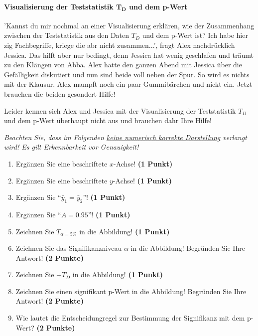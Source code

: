 \documentclass[a4paper, 9pt]{scrartcl}\usepackage[]{graphicx}\usepackage[]{xcolor}
\begin{document}
\ifcollection
\paragraph{Visualisierung der Teststatistik $\boldsymbol{T_D}$ und dem p-Wert}
\fi

'Kannst du mir nochmal an einer Visualisierung erklären, wie der Zusammenhang zwischen der Teststatistik aus den Daten $T_D$ und dem p-Wert ist? Ich habe hier zig Fachbegriffe, kriege die abr nicht zusammen...', fragt Alex nachdrücklich  Jessica. Das hilft aber nur bedingt, denn Jessica hat wenig geschlafen und träumt zu den Klängen von Abba. Alex hatte den ganzen Abend mit Jessica über die Gefälligkeit diskutiert und nun sind beide voll neben der Spur. So wird es nichts mit der Klausur. Alex mampft noch ein paar Gummibärchen und nickt ein. Jetzt brauchen die beiden gesondert Hilfe!

\vspace{1ex}

Leider kennen sich Alex und Jessica mit der Visualisierung der Teststatistik $T_D$ und dem p-Wert überhaupt nicht aus und brauchen dahr Ihre Hilfe!

\vspace{1ex}

\textit{Beachten Sie, dass im Folgenden \underline{keine numerisch korrekte Darstellung} verlangt wird! Es gilt Erkennbarkeit vor Genauigkeit!}

\begin{enumerate}
\item Ergänzen Sie eine beschriftete $x$-Achse! \textbf{(1 Punkt)}
\item Ergänzen Sie eine beschriftete $y$-Achse! \textbf{(1 Punkt)}
\item Ergänzen Sie "`$\bar{y}_1 = \bar{y}_2$"'! \textbf{(1 Punkt)} 
\item Ergänzen Sie "`$A = 0.95$"'! \textbf{(1 Punkt)}
\item Zeichnen Sie $T_{\alpha=5\%}$ in die Abbildung! \textbf{(1 Punkt)} 
\item Zeichnen Sie das Signifikanzniveau $\alpha$ in die Abbildung! Begründen Sie Ihre Antwort! \textbf{(2 Punkte)} 
\item Zeichnen Sie $+T_{D}$ in die Abbildung! \textbf{(1 Punkt)}
\item Zeichnen Sie einen signifikant p-Wert in die Abbildung! Begründen Sie Ihre Antwort! \textbf{(2 Punkte)}  
\item Wie lautet die Entscheidungregel zur Bestimmung der Signifikanz mit dem p-Wert? \textbf{(2 Punkte)}  
\end{enumerate}
\end{document}
